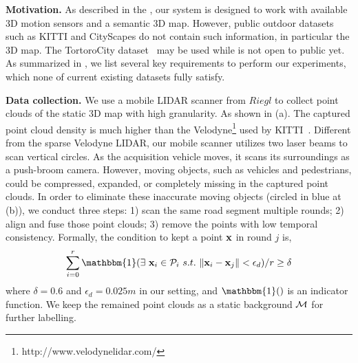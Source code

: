 \textbf{Motivation.}
As described in the , our system is designed to work with available 3D motion sensors and a semantic 3D map.
However, public outdoor datasets such as KITTI and CityScapes do not contain such information, in particular the 3D map. The TortoroCity dataset~\cite{wang2016torontocity} may be used while is not open to public yet. As summarized in , we list several key requirements to perform our experiments, which none of current existing datasets fully satisfy.  

\textbf{Data collection.}
We use a mobile LIDAR scanner from $Riegl$ to collect point clouds of the static 3D map with high granularity. As shown in (a). The captured point cloud density is much higher than the Velodyne\footnote{http://www.velodynelidar.com/} used by KITTI~\cite{geiger2012we}.
Different from the sparse Velodyne LIDAR, our mobile scanner utilizes two laser beams to scan vertical circles. As the acquisition vehicle moves, it scans its surroundings as a push-broom camera. However, moving objects, such as vehicles and pedestrians, could be compressed, expanded, or completely missing in the captured point clouds.
In order to eliminate these inaccurate moving objects (circled in blue at (b)), we conduct three steps:
1) scan the same road segment multiple rounds; 2) align and fuse those point clouds; 3) remove the points with low temporal consistency.
Formally, the condition to kept a point ${\mathbf x}$ in round $j$ is,
{\vspace{-0.5\baselineskip}
\begin{align}
\sum_{i=0}^{r}{\mathbbm{1}(\exists~\ve{x}_i \in \hua{P}_i~s.t.~\|\ve{x}_i - \ve{x}_j\| < \epsilon_d )} / r \geq \delta
\end{align}
}
where $\delta = 0.6$ and $\epsilon_d = 0.025m$ in our setting, and $\mathbbm{1}()$ is an indicator function. 
We keep the remained point clouds as a static background ${\mathcal M}$ for further labelling.

